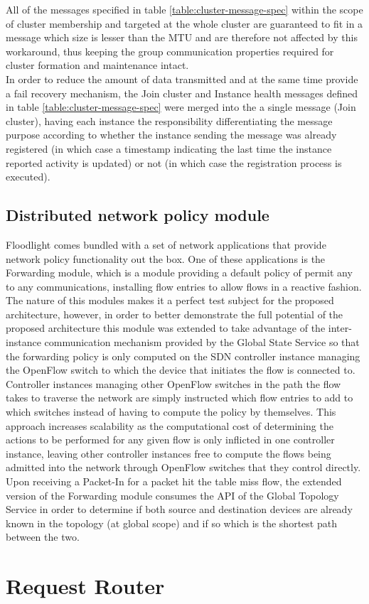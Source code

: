 All of the messages specified in table \ref{table:cluster-message-spec} within the scope of cluster membership and targeted at the whole cluster are guaranteed to fit in a message which size is lesser than the \gls{MTU} and are therefore not affected by this workaround, thus keeping the group communication properties required for cluster formation and maintenance intact.\\
In order to reduce the amount of data transmitted and at the same time provide a fail recovery mechanism, the Join cluster and Instance health messages defined in table \ref{table:cluster-message-spec} were merged into the a single message (Join cluster), having each instance the responsibility differentiating the message purpose according to whether the instance sending the message was already registered (in which case a timestamp indicating the last time the instance reported activity is updated) or not (in which case the registration process is executed).\\
%
\subsection{Distributed network policy module}
\label{subsection:poc-application}
%
Floodlight comes bundled with a set of network applications that provide network policy functionality out the box.
One of these applications is the Forwarding module, which is a module providing a default policy of permit any to any communications, installing flow entries to allow flows in a reactive fashion\cite{FLFwd}.\\
The nature of this modules makes it a perfect test subject for the proposed architecture, however, in order to better demonstrate the full potential of the proposed architecture this module was extended to take advantage of the inter-instance communication mechanism provided by the Global State Service so that the forwarding policy is only computed on the \gls{SDN} controller instance managing the OpenFlow switch to which the device that initiates the flow is connected to. Controller instances managing other OpenFlow switches in the path the flow takes to traverse the network are simply instructed which flow entries to add to which switches instead of having to compute the policy by themselves.
This approach increases scalability as the computational cost of determining the actions to be performed for any given flow is only inflicted in one controller instance, leaving other controller instances free to compute the flows being admitted into the network through OpenFlow switches that they control directly.\\
Upon receiving a Packet-In for a packet hit the table miss flow, the extended version of the Forwarding module consumes the \gls{API} of the Global Topology Service in order to determine if both source and destination devices are already known in the topology (at global scope) and if so which is the shortest path between the two.
%
\section{Request Router}
\label{section:request-router}

